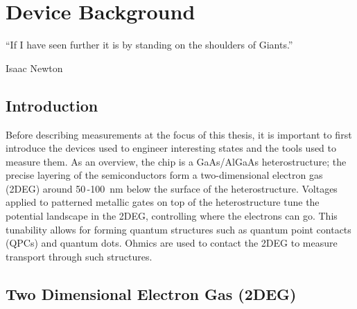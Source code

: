 \chapter{Device Background}\label{cha:device_background}


\epigraph{``If I have seen further it is by standing on the shoulders of Giants.''}{Isaac Newton~\cite{newton1959correspondence}}

\section{Introduction}

\noindent Before describing measurements at the focus of this thesis, it is important to first introduce the devices used to engineer interesting states and the tools used to measure them. As an overview, the chip is a GaAs/AlGaAs heterostructure; the precise layering of the semiconductors form a two-dimensional electron gas (2DEG) around 50\,-\qty{100}{nm} below the surface of the heterostructure. Voltages applied to patterned metallic gates on top of the heterostructure tune the potential landscape in the 2DEG, controlling where the electrons can go. This tunability allows for forming quantum structures such as quantum point contacts (QPCs) and quantum dots. Ohmics are used to contact the 2DEG to measure transport through such structures. 



\section{Two Dimensional Electron Gas (2DEG)}




